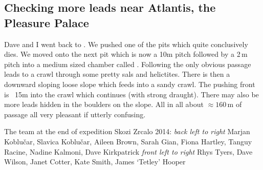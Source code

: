 \subsection{Checking more leads near Atlantis, the Pleasure Palace}
\label{sec:jericho}
Dave and I went back to . We pushed one of the pits which quite conclusively dies. We moved onto the next pit which is now a 10m pitch followed by a 2\,m pitch into a medium sized chamber called . Following the only obvious passage leads to  a crawl through some pretty sals and helictites. There is then a downward sloping loose slope which feeds into a sandy crawl. The pushing front is ~15m into the crawl which continues (with strong draught). There may also be more leads hidden in the boulders on the slope. All in all about $\approx160$\,m of passage all very pleasant if utterly confusing. 

\begin{pagefigure}
\checkoddpage \ifoddpage \forcerectofloat \else \forceversofloat \fi
\centering
{}
\caption{The team at the end of expedition Skozi Zrcalo 2014:  \emph{back left to right} Marjan Koblu\v{c}ar, Slavica Koblu\v{c}ar, Aileen Brown, Sarah Gian, Fiona Hartley, Tanguy Racine, Nadine Kalmoni, Dave Kirkpatrick \emph{front left to right} Rhys Tyers, Dave Wilson, Janet Cotter, Kate Smith, James `Tetley' Hooper }
\label{end of expo 2014}
\end{pagefigure}



